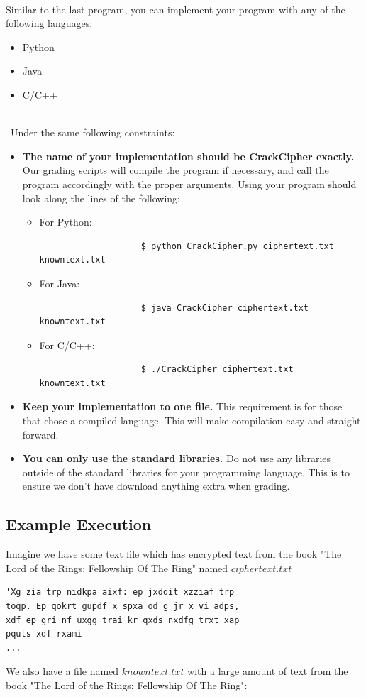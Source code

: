 \documentclass{article}
\begin{document}
\noindent \\ Similar to the last program, you can implement your program with any of the following languages:
\begin{itemize}
\item Python
\item Java
\item C/C++
\end{itemize}
\-\\\ Under the same following constraints:
\begin{itemize}
\item \textbf{The name of your implementation should be CrackCipher exactly.} Our grading scripts will compile the program if necessary, and call the program accordingly with the proper arguments. Using your program should look along the lines of the following:
	\begin{itemize}
	\item For Python:
		\begin{verbatim}
			        $ python CrackCipher.py ciphertext.txt knowntext.txt
		\end{verbatim}
	\item For Java:
		\begin{verbatim}
			        $ java CrackCipher ciphertext.txt knowntext.txt
		\end{verbatim}
	\item For C/C++:
		\begin{verbatim}
			        $ ./CrackCipher ciphertext.txt knowntext.txt
		\end{verbatim}
	\end{itemize}
\item \textbf{Keep your implementation to one file.} This requirement is for those that chose a compiled language. This will make compilation easy and straight forward.
\item \textbf{You can only use the standard libraries.} Do not use any libraries outside of the standard libraries for your programming language. This is to ensure we don't have download anything extra when grading.
\end{itemize}


\subsection{Example Execution}

Imagine we have some text file which has encrypted text from the book "The Lord of the Rings: Fellowship Of The Ring"  named $ciphertext.txt$
\begin{file}
\begin{lstlisting}[]
'Xg zia trp nidkpa aixf: ep jxddit xzziaf trp
toqp. Ep qokrt gupdf x spxa od g jr x vi adps,
xdf ep gri nf uxgg trai kr qxds nxdfg trxt xap
pquts xdf rxami
...
\end{lstlisting}
\end{file}
We also have a file named $knowntext.txt$ with a large amount of text from the book "The Lord of the Rings: Fellowship Of The Ring": \\
\end{document}
